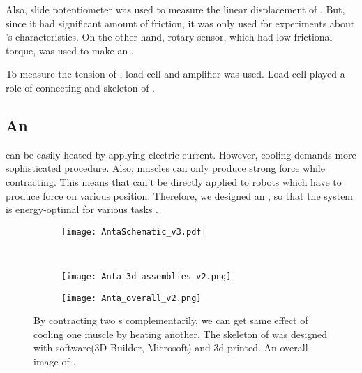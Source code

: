 Also, slide potentiometer was used to measure the linear displacement of \scp. But, since it had significant amount of friction, it was only used for experiments about \scp's characteristics. On the other hand, rotary sensor, which had low frictional torque, was used to make an \anta. 

To measure the tension of \scp, load cell and amplifier was used.
Load cell played a role of connecting \scp and skeleton of \anta.

\subsection{An \ANTA}
\scp can be easily heated by applying electric current. However, cooling demands more sophisticated procedure. Also, muscles can only produce strong force while contracting. This means that \scp can't be directly applied to robots which have to produce force on various position. Therefore, we designed an \antanospace, so that the system is energy-optimal for various tasks \cite{antagonism}.

\begin{figure}[t]
	\centering
	\begin{subfigure}[t]{0.5\textwidth}
		\centering\texttt{[image: AntaSchematic\_v3.pdf]}
		\caption{\label{anta_sch}}
	\end{subfigure}
	~			
	\begin{subfigure}[t]{0.3\textwidth}
		\centering\texttt{[image: Anta\_3d\_assemblies\_v2.png]}
		\caption{\label{3d_assemblies}}
	\end{subfigure}
	
	\begin{subfigure}[t]{0.81\textwidth}
		\centering\texttt{[image: Anta\_overall\_v2.png]}
		\caption{\label{anta_overall}}
	\end{subfigure}
	
	\caption[An \anta]{ By contracting two \scpnospace s complementarily, we can get same effect of cooling one muscle by heating another.  The skeleton of \anta was designed with software(3D Builder, Microsoft) and 3d-printed.  An overall image of \anta.}
	\label{anta_design}
\end{figure}
